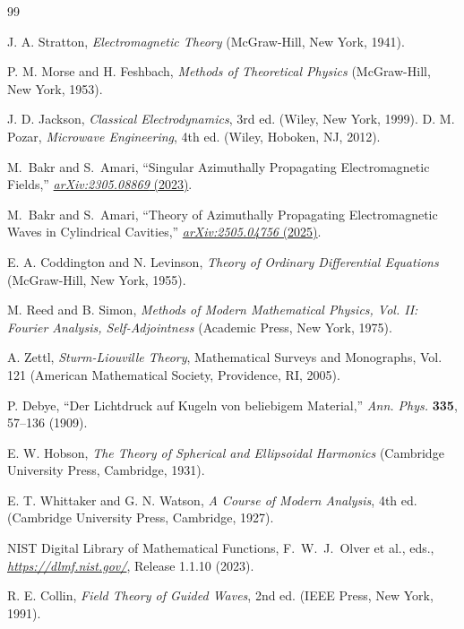 \documentclass[
  aip,
  amsmath,amssymb,
  preprint
]{revtex4-1}
\begin{document}
\begin{thebibliography}{99}

J. A. Stratton, \textit{Electromagnetic Theory} (McGraw-Hill, New York, 1941).

P. M. Morse and H. Feshbach, \textit{Methods of Theoretical Physics} (McGraw-Hill, New York, 1953).

J. D. Jackson, \textit{Classical Electrodynamics}, 3rd ed. (Wiley, New York, 1999).
D. M. Pozar, \textit{Microwave Engineering}, 4th ed. (Wiley, Hoboken, NJ, 2012).

M.~Bakr and S.~Amari, ``Singular Azimuthally Propagating Electromagnetic Fields,'' \href{https://arxiv.org/abs/2305.08869}{\emph{arXiv:2305.08869} (2023)}.

M.~Bakr and S.~Amari, ``Theory of Azimuthally Propagating Electromagnetic Waves in Cylindrical Cavities,'' \href{https://arxiv.org/abs/2505.04756}{\emph{arXiv:2505.04756} (2025)}.

E. A. Coddington and N. Levinson, \textit{Theory of Ordinary Differential Equations} (McGraw-Hill, New York, 1955).

M. Reed and B. Simon, \textit{Methods of Modern Mathematical Physics, Vol. II: Fourier Analysis, Self-Adjointness} (Academic Press, New York, 1975).

A. Zettl, \textit{Sturm-Liouville Theory}, Mathematical Surveys and Monographs, Vol. 121 (American Mathematical Society, Providence, RI, 2005).

P. Debye, ``Der Lichtdruck auf Kugeln von beliebigem Material,'' \textit{Ann. Phys.} \textbf{335}, 57--136 (1909).


E. W. Hobson, \textit{The Theory of Spherical and Ellipsoidal Harmonics} (Cambridge University Press, Cambridge, 1931).

E. T. Whittaker and G. N. Watson, \textit{A Course of Modern Analysis}, 4th ed. (Cambridge University Press, Cambridge, 1927).

NIST Digital Library of Mathematical Functions, F.~W.~J.~Olver et al., eds.,
\href{https://dlmf.nist.gov/}{\emph{https://dlmf.nist.gov/}}, Release 1.1.10 (2023).

R. E. Collin, \textit{Field Theory of Guided Waves}, 2nd ed. (IEEE Press, New York, 1991).


\end{thebibliography}
\end{document}
